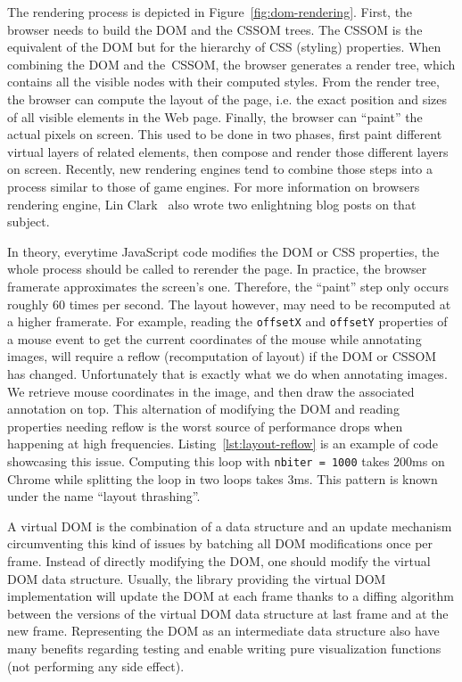 The rendering process is depicted in Figure~\ref{fig:dom-rendering}.
First, the browser needs to build the DOM and the CSSOM trees.
The CSSOM is the equivalent of the DOM but for the hierarchy of CSS (styling) properties.
When combining the DOM and the CSSOM, the browser generates a render tree,
which contains all the visible nodes with their computed styles.
From the render tree, the browser can compute the layout of the page,
i.e. the exact position and sizes of all visible elements in the Web page.
Finally, the browser can ``paint'' the actual pixels on screen.
This used to be done in two phases,
first paint different virtual layers of related elements,
then compose and render those different layers on screen.
Recently, new rendering engines tend to combine those steps
into a process similar to those of game engines.
For more information on browsers rendering engine,
Lin Clark~\cite{clark-stylo, clark-webrender} also wrote
two enlightning blog posts on that subject.

In theory, everytime JavaScript code modifies the DOM or CSS properties,
the whole process should be called to rerender the page.
In practice, the browser framerate approximates the screen's one.
Therefore, the ``paint'' step only occurs roughly 60 times per second.
The layout however, may need to be recomputed at a higher framerate.
For example, reading the \verb|offsetX| and \verb|offsetY| properties
of a mouse event to get the current coordinates of the mouse while annotating images,
will require a reflow (recomputation of layout) if the DOM or CSSOM has changed.
Unfortunately that is exactly what we do when annotating images.
We retrieve mouse coordinates in the image,
and then draw the associated annotation on top.
This alternation of modifying the DOM and reading properties needing reflow
is the worst source of performance drops when happening at high frequencies.
Listing~\ref{lst:layout-reflow} is an example of code showcasing this issue.
Computing this loop with \verb|nbiter = 1000| takes 200ms on Chrome
while splitting the loop in two loops takes 3ms.
This pattern is known under the name ``layout thrashing''.



A virtual DOM is the combination of a data structure and an update mechanism
circumventing this kind of issues by batching all DOM modifications once per frame.
Instead of directly modifying the DOM,
one should modify the virtual DOM data structure.
Usually, the library providing the virtual DOM implementation will update the DOM at each frame
thanks to a diffing algorithm between the versions of the virtual DOM data structure at last frame
and at the new frame.
Representing the DOM as an intermediate data structure also have many benefits regarding testing
and enable writing pure visualization functions (not performing any side effect).

